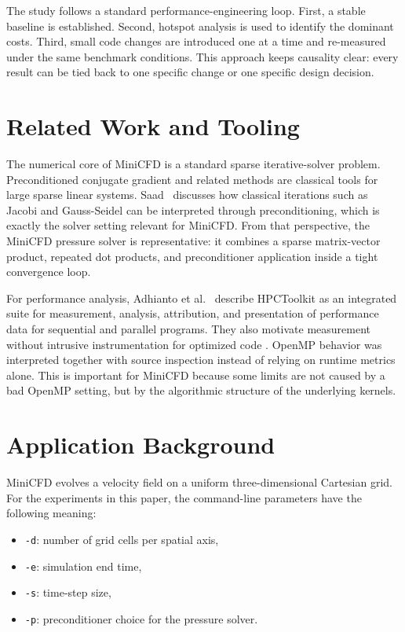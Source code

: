 \documentclass[10pt,firstlineindent,nopartpage,article,accentcolor=tud1b]{tudreport}
\begin{document}
The study follows a standard performance-engineering loop. First, a stable
baseline is established. Second, hotspot analysis is used to identify the
dominant costs. Third, small code changes are introduced one at a time and
re-measured under the same benchmark conditions. This approach keeps causality
clear: every result can be tied back to one specific change or one specific
design decision.

\section{Related Work and Tooling}
The numerical core of MiniCFD is a standard sparse iterative-solver problem.
Preconditioned conjugate gradient and related methods are classical tools for
large sparse linear systems. Saad~\cite[pp.~107,~113]{saad} discusses how
classical iterations such as Jacobi and Gauss-Seidel can be interpreted through
preconditioning, which is exactly the solver setting relevant for MiniCFD.
From that perspective, the MiniCFD pressure solver is representative: it
combines a sparse matrix-vector product, repeated dot products, and
preconditioner application inside a tight convergence loop.

For performance analysis, Adhianto et al.~\cite[p.~685]{hpctoolkit} describe
HPCToolkit as an integrated suite for measurement, analysis, attribution, and
presentation of performance data for sequential and parallel programs. They
also motivate measurement without intrusive instrumentation for optimized code
\cite[p.~686]{hpctoolkit}. OpenMP behavior was interpreted together
with source inspection instead of relying on runtime metrics alone. This is
important for MiniCFD because some limits are not caused by a bad OpenMP
setting, but by the algorithmic structure of the underlying kernels.

\section{Application Background}
MiniCFD evolves a velocity field on a uniform three-dimensional Cartesian grid.
For the experiments in this paper, the command-line parameters have the
following meaning:
\begin{itemize}[leftmargin=*]
\item \texttt{-d}: number of grid cells per spatial axis,
\item \texttt{-e}: simulation end time,
\item \texttt{-s}: time-step size,
\item \texttt{-p}: preconditioner choice for the pressure solver.
\end{itemize}
\end{document}
